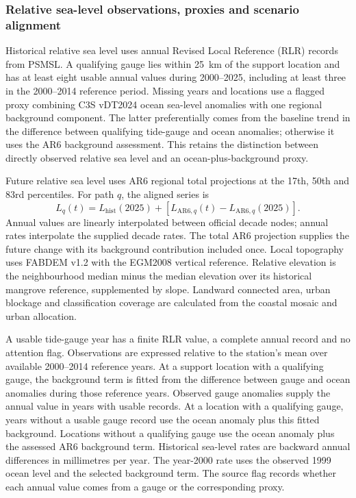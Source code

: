 \subsubsection{Relative sea-level observations, proxies and scenario alignment}

Historical relative sea level uses annual Revised Local Reference (RLR) records from PSMSL\cite{Holgate2013,PSMSL2026}. A qualifying gauge lies within 25~km of the support location and has at least eight usable annual values during 2000--2025, including at least three in the 2000--2014 reference period. Missing years and locations use a flagged proxy combining C3S vDT2024 ocean sea-level anomalies\cite{C3SSeaLevel2018} with one regional background component. The latter preferentially comes from the baseline trend in the difference between qualifying tide-gauge and ocean anomalies; otherwise it uses the AR6 background assessment. This retains the distinction between directly observed relative sea level and an ocean-plus-background proxy.

Future relative sea level uses AR6 regional total projections at the 17th, 50th and 83rd percentiles\cite{AR6SL2021,IPCC2021Chapter9,Kopp2023}. For path $q$, the aligned series is
\begin{equation}\label{eq:si_rsl}
L_q(t)=L_{\mathrm{hist}}(2025)+[L_{\mathrm{AR6},q}(t)-L_{\mathrm{AR6},q}(2025)].
\end{equation}
Annual values are linearly interpolated between official decade nodes; annual rates interpolate the supplied decade rates. The total AR6 projection supplies the future change with its background contribution included once. Local topography uses FABDEM v1.2 with the EGM2008 vertical reference\cite{Hawker2022,FABDEM12}. Relative elevation is the neighbourhood median minus the median elevation over its historical mangrove reference, supplemented by slope. Landward connected area, urban blockage and classification coverage are calculated from the coastal mosaic and urban allocation.

A usable tide-gauge year has a finite RLR value, a complete annual record and no attention flag. Observations are expressed relative to the station's mean over available 2000--2014 reference years. At a support location with a qualifying gauge, the background term is fitted from the difference between gauge and ocean anomalies during those reference years. Observed gauge anomalies supply the annual value in years with usable records. At a location with a qualifying gauge, years without a usable gauge record use the ocean anomaly plus this fitted background. Locations without a qualifying gauge use the ocean anomaly plus the assessed AR6 background term. Historical sea-level rates are backward annual differences in millimetres per year. The year-2000 rate uses the observed 1999 ocean level and the selected background term. The source flag records whether each annual value comes from a gauge or the corresponding proxy.

